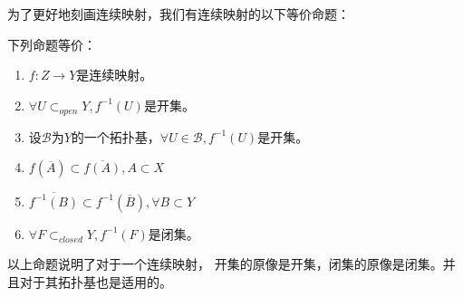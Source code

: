 \documentclass[lang=cn,10pt,device=pad]{elegantbook}
\newcommand{\tpj}{\mathcal{B}}
\begin{document}
为了更好地刻画连续映射，我们有连续映射的以下等价命题：
\begin{proposition}\label{c2-m3}下列命题等价：
	\begin{enumerate}
		\item $f:Z\longrightarrow Y$是连续映射。
		\item $\forall U\subset_{open} Y,f^{-1}(U)$是开集。
		\item 设$\tpj$为$Y$的一个拓扑基，$\forall U\in \tpj,f^{-1}(U)$是开集。
		\item $f(\overline{A}) \subset \overline{f(A)} ,A\subset X$
		\item $\overline{f^{-1}(B)}\subset f^{-1}(\overline{B}),\forall B\subset Y$
		\item $\forall F\subset_{closed}Y,f^{-1}(F)$是闭集。
	\end{enumerate}
\end{proposition}
\begin{note}
以上命题说明了对于一个连续映射，	开集的原像是开集，闭集的原像是闭集。并且对于其拓扑基也是适用的。
\end{note}
\end{document}
